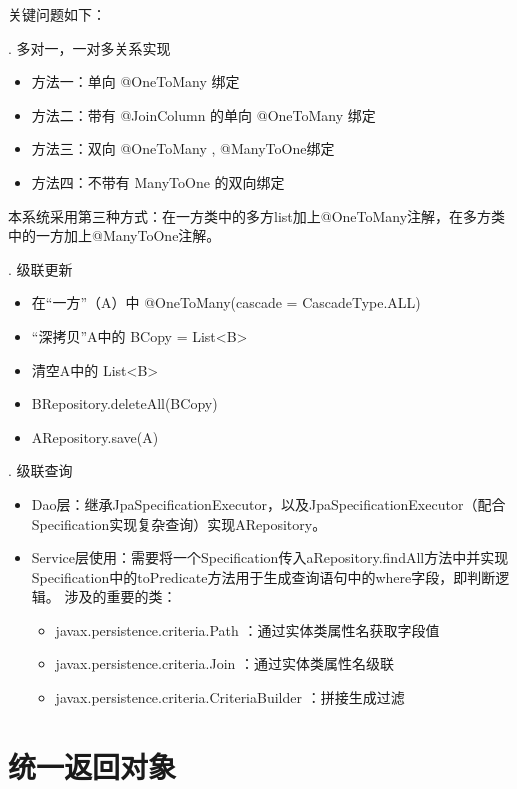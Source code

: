 \noindent 关键问题如下：

.  多对一，一对多关系实现

\begin{itemize}
  \item 方法一：单向 @OneToMany 绑定
  \item 方法二：带有 @JoinColumn 的单向 @OneToMany 绑定
  \item 方法三：双向 @OneToMany , @ManyToOne绑定
  \item 方法四：不带有 ManyToOne 的双向绑定
\end{itemize}

本系统采用第三种方式：在一方类中的多方list加上@OneToMany注解，在多方类中的一方加上@ManyToOne注解。

.  级联更新

\begin{itemize}
  \item 在“一方”（A）中  @OneToMany(cascade = CascadeType.ALL)
  \item “深拷贝”A中的  BCopy = List<B>
  \item 清空A中的  List<B>
  \item  BRepository.deleteAll(BCopy)
  \item  ARepository.save(A)
\end{itemize}

.  级联查询

\begin{itemize}
  \item Dao层：继承JpaSpecificationExecutor，以及JpaSpecificationExecutor（配合Specification实现复杂查询）实现ARepository。
  \item Service层使用：需要将一个Specification传入aRepository.findAll方法中并实现Specification中的toPredicate方法用于生成查询语句中的where字段，即判断逻辑。
        涉及的重要的类：
        \begin{itemize}
          \item  javax.persistence.criteria.Path ：通过实体类属性名获取字段值
          \item  javax.persistence.criteria.Join ：通过实体类属性名级联
          \item  javax.persistence.criteria.CriteriaBuilder ：拼接生成过滤
        \end{itemize}
\end{itemize}

\section{统一返回对象}

